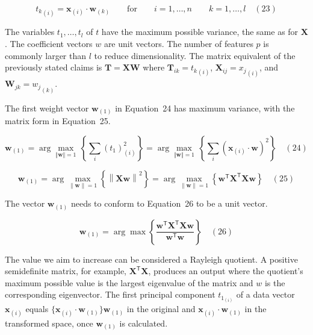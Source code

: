 \documentclass[preprint,12pt]{elsarticle}
\begin{document}
\begin{equation}
	{t_{k}}_{\left(i\right)}=\mathbf{x}_{\left(i\right)}\cdot \mathbf{w}_{\left(k\right)}\qquad \mathrm{for} \qquad i=1,\dots ,n\qquad k=1,\dots ,l
	\quad\left(23\right)
\end{equation}

The variables $t_{1},\dots ,t_{l}$ of $t$ have the maximum possible variance, the same as for $\mathbf{X}$. The coefficient vectors $w$ are unit vectors. The number of features $p$ is commonly larger than $l$ to reduce dimensionality. The matrix equivalent of the previously stated claims is $\mathbf{T}=\mathbf{X} \mathbf{W}$ where ${\mathbf{T}}_{ik}={t_{k}}_{\left(i\right)}$, ${\mathbf{X}}_{ij}={x_{j}}_{\left(i\right)}$, and ${\mathbf{W}}_{jk}={w_{j}}_{\left(k\right)}$.

The first weight vector $\mathbf{w}_{\left(1\right)}$ in Equation~24 has maximum variance, with the matrix form in Equation~25.

\begin{equation}
	\mathbf{w}_{\left(1\right)}=\arg \max_{\Vert \mathbf{w} \Vert =1}\,\left\{\sum_{i}(t_{1})_{\left(i\right)}^{2}\right\}=\arg \max_{\Vert \mathbf{w} \Vert =1}\,\left\{\sum_{i}\left(\mathbf{x}_{\left(i\right)}\cdot \mathbf{w} \right)^{2}\right\}
	\quad\left(24\right)
\end{equation}

\begin{equation}
	\mathbf{w}_{\left(1\right)}=\arg \max_{\left\|\mathbf{w} \right\|=1}\left\{\left\|\mathbf{Xw} \right\|^{2}\right\}=\arg \max_{\left\|\mathbf{w} \right\|=1}\left\{\mathbf{w}^{\mathsf{T}}\mathbf{X}^{\mathsf{T}}\mathbf{Xw} \right\}
	\quad\left(25\right)
\end{equation}

The vector $\mathbf{w}_{\left(1\right)}$ needs to conform to Equation~26 to be a unit vector.

\begin{equation}
	\mathbf{w}_{\left(1\right)}=\arg \max \left\{{\frac{\mathbf{w}^{\mathsf{T}}\mathbf{X}^{\mathsf{T}}\mathbf{Xw}}{\mathbf{w}^{\mathsf{T}}\mathbf{w}}}\right\}
	\quad\left(26\right)
\end{equation}

The value we aim to increase can be considered a Rayleigh quotient. A positive semidefinite matrix, for example, $\mathbf{X}^{\mathsf{T}}\mathbf{X}$, produces an output where the quotient's maximum possible value is the largest eigenvalue of the matrix and $w$ is the corresponding eigenvector.
The first principal component  $t_{1_{\left(i\right)}}$ of a data vector $\mathbf{x}_{\left(i\right)}$ equals $\{\mathbf{x}_{\left(i\right)} \cdot \mathbf{w}_{\left(1\right)}\} \mathbf{w}_{\left(1\right)}$  in the original and $\mathbf{x}_{\left(i\right)} \cdot \mathbf{w}_{\left(1\right)}$ in the transformed space, once $\mathbf{w}_{\left(1\right)}$ is calculated.
\end{document}
